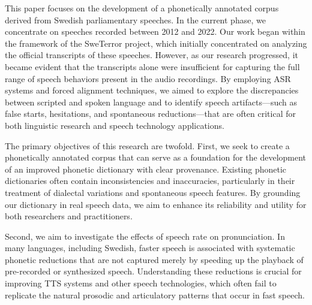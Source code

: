 \documentclass{Interspeech}
\begin{document}


This paper focuses on the development of a phonetically annotated corpus derived from Swedish parliamentary speeches. In the current phase, we concentrate on speeches recorded between 2012 and 2022.
Our work began within the framework of the SweTerror project, which initially concentrated on analyzing the official transcripts of these speeches. However, as our research progressed, it became evident that the transcripts alone were insufficient for capturing the full range of speech behaviors present in the audio recordings. By employing ASR systems and forced alignment techniques, we aimed to explore the discrepancies between scripted and spoken language and to identify speech artifacts—such as false starts, hesitations, and spontaneous reductions—that are often critical for both linguistic research and speech technology applications.

The primary objectives of this research are twofold. First, we seek to create a phonetically annotated corpus that can serve as a foundation for the development of an improved phonetic dictionary with clear provenance. Existing phonetic dictionaries often contain inconsistencies and inaccuracies, particularly in their treatment of dialectal variations and spontaneous speech features. By grounding our dictionary in real speech data, we aim to enhance its reliability and utility for both researchers and practitioners.

Second, we aim to investigate the effects of speech rate on pronunciation. In many languages, including Swedish, faster speech is associated with systematic phonetic reductions that are not captured merely by speeding up the playback of pre-recorded or synthesized speech. Understanding these reductions is crucial for improving TTS systems and other speech technologies, which often fail to replicate the natural prosodic and articulatory patterns that occur in fast speech.
\end{document}
